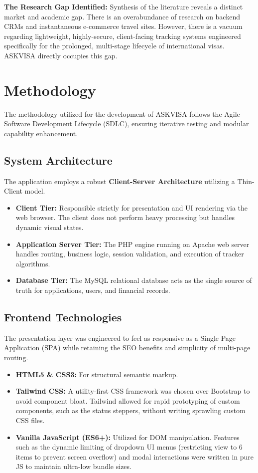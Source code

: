 \documentclass[12pt, a4paper]{article}
\begin{document}
\textbf{The Research Gap Identified:} Synthesis of the literature reveals a distinct market and academic gap. There is an overabundance of research on backend CRMs and instantaneous e-commerce travel sites. However, there is a vacuum regarding lightweight, highly-secure, client-facing tracking systems engineered specifically for the prolonged, multi-stage lifecycle of international visas. ASKVISA directly occupies this gap.

\newpage

\section{Methodology}
The methodology utilized for the development of ASKVISA follows the Agile Software Development Lifecycle (SDLC), ensuring iterative testing and modular capability enhancement. 

\subsection{System Architecture}
The application employs a robust \textbf{Client-Server Architecture} utilizing a Thin-Client model. 
\begin{itemize}
    \item \textbf{Client Tier:} Responsible strictly for presentation and UI rendering via the web browser. The client does not perform heavy processing but handles dynamic visual states.
    \item \textbf{Application Server Tier:} The PHP engine running on Apache web server handles routing, business logic, session validation, and execution of tracker algorithms.
    \item \textbf{Database Tier:} The MySQL relational database acts as the single source of truth for applications, users, and financial records.
\end{itemize}

\subsection{Frontend Technologies}
The presentation layer was engineered to feel as responsive as a Single Page Application (SPA) while retaining the SEO benefits and simplicity of multi-page routing.
\begin{itemize}
    \item \textbf{HTML5 \& CSS3:} For structural semantic markup.
    \item \textbf{Tailwind CSS:} A utility-first CSS framework was chosen over Bootstrap to avoid component bloat. Tailwind allowed for rapid prototyping of custom components, such as the status steppers, without writing sprawling custom CSS files.
    \item \textbf{Vanilla JavaScript (ES6+):} Utilized for DOM manipulation. Features such as the dynamic limiting of dropdown UI menus (restricting view to 6 items to prevent screen overflow) and modal interactions were written in pure JS to maintain ultra-low bundle sizes.
\end{itemize}
\end{document}
